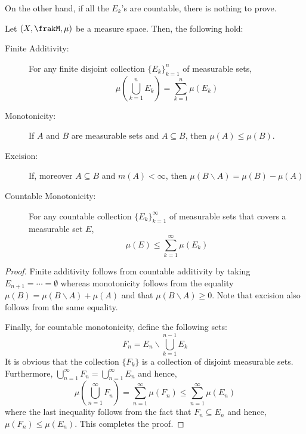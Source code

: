 On the other hand, if all the $E_k$'s are countable, there is nothing to prove.

\begin{proposition}
    Let $(X,\frakM,\mu)$ be a measure space. Then, the following hold: 
    \begin{description}
    \item[Finite Additivity:] For any finite disjoint collection $\{E_k\}_{k = 1}^n$ of measurable sets, 
    \begin{equation*}
        \mu\left(\bigcup_{k = 1}^n E_k\right) = \sum_{k = 1}^n\mu(E_k)
    \end{equation*}

    \item[Monotonicity:] If $A$ and $B$ are measurable sets and $A\subseteq B$, then $\mu(A)\le\mu(B)$. 
    
    \item[Excision:] If, moreover $A\subseteq B$ and $m(A) < \infty$, then $\mu(B\backslash A) = \mu(B) - \mu(A)$ 
    
    \item[Countable Monotonicity:] For any countable collection $\{E_k\}_{k = 1}^\infty$ of measurable sets that covers a measurable set $E$,
    \begin{equation*}
        \mu(E)\le\sum_{k = 1}^\infty\mu(E_k)
    \end{equation*}
    \end{description}
\end{proposition}
\begin{proof}
    Finite additivity follows from countable additivity by taking $E_{n + 1} = \cdots = \emptyset$ whereas monotonicity follows from the equality $\mu(B) = \mu(B\backslash A) + \mu(A)$ and that $\mu(B\backslash A)\ge 0$. Note that excision also follows from the same equality. 

    Finally, for countable monotonicity, define the following sets: 
    \begin{equation*}
        F_n = E_n\backslash\bigcup_{k = 1}^{n - 1} E_k
    \end{equation*}
    It is obvious that the collection $\{F_k\}$ is a collection of disjoint measurable sets. Furthermore, $\bigcup\limits_{n = 1}^\infty F_n = \bigcup\limits_{n = 1}^\infty E_n$ and hence, 
    \begin{equation*}
        \mu\left(\bigcup_{n = 1}^\infty F_n\right) = \sum_{n = 1}^\infty\mu(F_n)\le\sum_{n = 1}^\infty\mu(E_n)
    \end{equation*}
    where the last inequality follows from the fact that $F_n\subseteq E_n$ and hence, $\mu(F_n)\le\mu(E_n)$. This completes the proof.
\end{proof}

